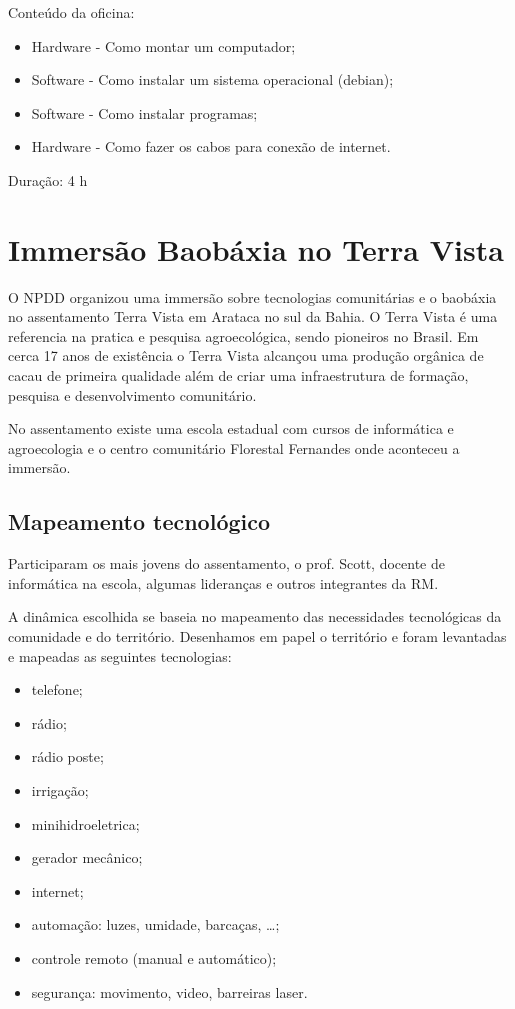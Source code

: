 \documentclass[a4paper, 11pt, oneside]{Relatorio_sem_2}  %
\begin{document}
Conteúdo da oficina:
\begin{itemize}
\item Hardware - Como montar um computador;
\item Software - Como instalar um sistema operacional (debian);
\item Software - Como instalar programas; 
\item Hardware - Como fazer os cabos para conexão de internet.
\end{itemize}
Duração: 4 h


\section{Immersão Baobáxia no Terra Vista}
O NPDD organizou uma immersão sobre tecnologias comunitárias e o
baobáxia no assentamento Terra Vista em Arataca no sul da Bahia.  O
Terra Vista é uma referencia na pratica e pesquisa agroecológica,
sendo pioneiros no Brasil. Em cerca 17 anos de existência o Terra
Vista alcançou uma produção orgânica de cacau de primeira qualidade
além de criar uma infraestrutura de formação, pesquisa e
desenvolvimento comunitário.

No assentamento existe uma escola estadual com cursos de informática e
agroecologia e o centro comunitário Florestal Fernandes onde aconteceu
a immersão.

\subsection{Mapeamento tecnológico}
Participaram os mais jovens do assentamento, o prof. Scott, docente de
informática na escola, algumas lideranças e outros integrantes da RM.

A dinâmica escolhida se baseia no mapeamento das necessidades
tecnológicas da comunidade e do território. Desenhamos em papel o
território e foram levantadas e mapeadas as seguintes tecnologias:
\begin{itemize}
\item telefone;
\item rádio;
\item rádio poste;
\item irrigação;
\item minihidroeletrica;
\item gerador mecânico;
\item internet;
\item automação: luzes, umidade, barcaças, \ldots;
\item controle remoto (manual e automático);
\item segurança: movimento, video, barreiras laser.
\end{itemize}
\end{document}
